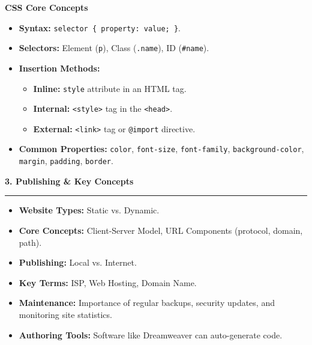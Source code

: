 \documentclass[a4paper, 8pt]{extarticle}
\newcommand{\sectionheading}[1]{\large\textbf{#1}\par\noindent\rule{\linewidth}{0.4pt}}
\newcommand{\subsectionheading}[1]{\normalsize\textbf{#1}}
\begin{document}
\begin{multicols}{2}
\subsectionheading{CSS Core Concepts}
\begin{itemize}
    \item \textbf{Syntax:} \texttt{selector \{ property: value; \}}.
    \item \textbf{Selectors:} Element (\texttt{p}), Class (\texttt{.name}), ID (\texttt{\#name}).
    \item \textbf{Insertion Methods:}
        \begin{itemize}
            \item \textbf{Inline:} \texttt{style} attribute in an HTML tag.
            \item \textbf{Internal:} \texttt{<style>} tag in the \texttt{<head>}.
            \item \textbf{External:} \texttt{<link>} tag or \texttt{@import} directive.
        \end{itemize}
    \item \textbf{Common Properties:} \texttt{color}, \texttt{font-size}, \texttt{font-family}, \texttt{background-color}, \texttt{margin}, \texttt{padding}, \texttt{border}.
\end{itemize}

\vspace{1em}
\sectionheading{3. Publishing \& Key Concepts}
\vspace{0.5em}
\begin{itemize}
    \item \textbf{Website Types:} Static vs. Dynamic.
    \item \textbf{Core Concepts:} Client-Server Model, URL Components (protocol, domain, path).
    \item \textbf{Publishing:} Local vs. Internet.
    \item \textbf{Key Terms:} ISP, Web Hosting, Domain Name.
    \item \textbf{Maintenance:} Importance of regular backups, security updates, and monitoring site statistics.
    \item \textbf{Authoring Tools:} Software like Dreamweaver can auto-generate code.
\end{itemize}


\columnbreak %



\end{multicols}
\end{document}
